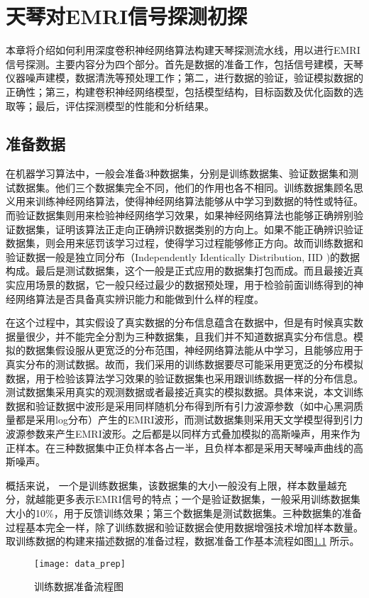 \clearpage

\chapter{天琴对EMRI信号探测初探}

本章将介绍如何利用深度卷积神经网络算法构建天琴探测流水线，用以进行EMRI信号探测。主要内容分为四个部分。首先是数据的准备工作，包括信号建模，天琴仪器噪声建模，数据清洗等预处理工作；第二，进行数据的验证，验证模拟数据的正确性；第三，构建卷积神经网络模型，包括模型结构，目标函数及优化函数的选取等；最后，评估探测模型的性能和分析结果。




\section{准备数据}
在机器学习算法中，一般会准备3种数据集，分别是训练数据集、验证数据集和测试数据集。他们三个数据集完全不同，他们的作用也各不相同。训练数据集顾名思义用来训练神经网络算法，使得神经网络算法能够从中学习到数据的特性或特征。而验证数据集则用来检验神经网络学习效果，如果神经网络算法也能够正确辨别验证数据集，证明该算法正走向正确辨识数据类别的方向上。如果不能正确辨识验证数据集，则会用来惩罚该学习过程，使得学习过程能够修正方向。故而训练数据和验证数据一般是独立同分布（Independently Identically Distribution, IID )的数据构成。最后是测试数据集，这个一般是正式应用的数据集打包而成。而且最接近真实应用场景的数据，它一般只经过最少的数据预处理，用于检验前面训练得到的神经网络算法是否具备真实辨识能力和能做到什么样的程度。

在这个过程中，其实假设了真实数据的分布信息蕴含在数据中，但是有时候真实数据量很少，并不能完全分割为三种数据集，且我们并不知道数据真实分布信息。模拟的数据集假设服从更宽泛的分布范围，神经网络算法能从中学习，且能够应用于真实分布的测试数据。故而，我们采用的训练数据要尽可能采用更宽泛的分布模拟数据，用于检验该算法学习效果的验证数据集也采用跟训练数据一样的分布信息。测试数据集采用真实的观测数据或者最接近真实的模拟数据。具体来说，本文训练数据和验证数据中波形是采用同样随机分布得到所有引力波源参数（如中心黑洞质量都是采用log分布）产生的EMRI波形，而测试数据集则采用天文学模型得到引力波源参数来产生EMRI波形。之后都是以同样方式叠加模拟的高斯噪声，用来作为正样本。在三种数据集中正负样本各占一半，且负样本都是采用天琴噪声曲线的高斯噪声。



概括来说，
一个是训练数据集，该数据集的大小一般没有上限，样本数量越充分，就越能更多表示EMRI信号的特点；一个是验证数据集，一般采用训练数据集大小的10\%，用于反馈训练效果；第三个数据集是测试数据集。三种数据集的准备过程基本完全一样，除了训练数据和验证数据会使用数据增强技术增加样本数量。
取训练数据的构建来描述数据的准备过程，数据准备工作基本流程如图\ref{fig:data_prep}
所示。
\begin{figure}[htbp]
 \centering
 \texttt{[image: data\_prep]}
    \caption{\label{fig:data_prep}训练数据准备流程图}
\end{figure}


